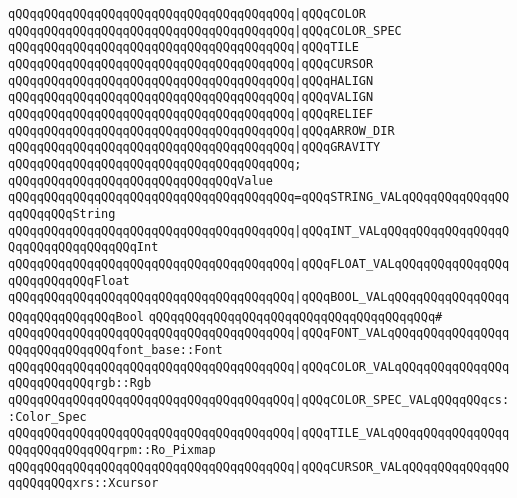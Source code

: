 \verb|qQQqqQQqqQQqqQQqqQQqqQQqqQQqqQQqqQQqqQQq|\verb#|qQQqCOLOR#\newline
\verb|qQQqqQQqqQQqqQQqqQQqqQQqqQQqqQQqqQQqqQQq|\verb#|qQQqCOLOR_SPEC#\newline
\verb|qQQqqQQqqQQqqQQqqQQqqQQqqQQqqQQqqQQqqQQq|\verb#|qQQqTILE#\newline
\verb|qQQqqQQqqQQqqQQqqQQqqQQqqQQqqQQqqQQqqQQq|\verb#|qQQqCURSOR#\newline
\verb|qQQqqQQqqQQqqQQqqQQqqQQqqQQqqQQqqQQqqQQq|\verb#|qQQqHALIGN#\newline
\verb|qQQqqQQqqQQqqQQqqQQqqQQqqQQqqQQqqQQqqQQq|\verb#|qQQqVALIGN#\newline
\verb|qQQqqQQqqQQqqQQqqQQqqQQqqQQqqQQqqQQqqQQq|\verb#|qQQqRELIEF#\newline
\verb|qQQqqQQqqQQqqQQqqQQqqQQqqQQqqQQqqQQqqQQq|\verb#|qQQqARROW_DIR#\newline
\verb|qQQqqQQqqQQqqQQqqQQqqQQqqQQqqQQqqQQqqQQq|\verb#|qQQqGRAVITY#\newline
\verb|qQQqqQQqqQQqqQQqqQQqqQQqqQQqqQQqqQQqqQQq;|\newline
\newline
\verb|qQQqqQQqqQQqqQQqqQQqqQQqqQQqqQQqValue|\newline
\verb|qQQqqQQqqQQqqQQqqQQqqQQqqQQqqQQqqQQqqQQq=qQQqSTRING_VALqQQqqQQqqQQqqQQqqQQqqQQqString|\newline
\verb|qQQqqQQqqQQqqQQqqQQqqQQqqQQqqQQqqQQqqQQq|\verb#|qQQqINT_VALqQQqqQQqqQQqqQQqqQQqqQQqqQQqqQQqqQQqInt#\newline
\verb|qQQqqQQqqQQqqQQqqQQqqQQqqQQqqQQqqQQqqQQq|\verb#|qQQqFLOAT_VALqQQqqQQqqQQqqQQqqQQqqQQqqQQqFloat#\newline
\verb|qQQqqQQqqQQqqQQqqQQqqQQqqQQqqQQqqQQqqQQq|\verb#|qQQqBOOL_VALqQQqqQQqqQQqqQQqqQQqqQQqqQQqqQQqBool#\newline
\verb|qQQqqQQqqQQqqQQqqQQqqQQqqQQqqQQqqQQqqQQq#|\newline
\verb|qQQqqQQqqQQqqQQqqQQqqQQqqQQqqQQqqQQqqQQq|\verb#|qQQqFONT_VALqQQqqQQqqQQqqQQqqQQqqQQqqQQqqQQqfont_base::Font#\newline
\verb|qQQqqQQqqQQqqQQqqQQqqQQqqQQqqQQqqQQqqQQq|\verb#|qQQqCOLOR_VALqQQqqQQqqQQqqQQqqQQqqQQqqQQqrgb::Rgb#\newline
\verb|qQQqqQQqqQQqqQQqqQQqqQQqqQQqqQQqqQQqqQQq|\verb#|qQQqCOLOR_SPEC_VALqQQqqQQqcs::Color_Spec#\newline
\verb|qQQqqQQqqQQqqQQqqQQqqQQqqQQqqQQqqQQqqQQq|\verb#|qQQqTILE_VALqQQqqQQqqQQqqQQqqQQqqQQqqQQqqQQqrpm::Ro_Pixmap#\newline
\verb|qQQqqQQqqQQqqQQqqQQqqQQqqQQqqQQqqQQqqQQq|\verb#|qQQqCURSOR_VALqQQqqQQqqQQqqQQqqQQqqQQqxrs::Xcursor#\newline
